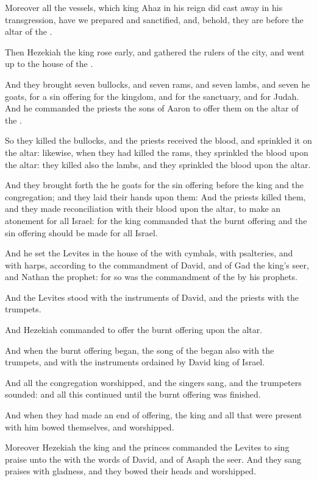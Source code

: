 \verse Moreover all the vessels, which king Ahaz in his reign did cast away in his transgression, have we prepared and sanctified, and, behold, they are before the altar of the \LORD.

\verse Then Hezekiah the king rose early, and gathered the rulers of the city, and went up to the house of the \LORD.

\verse And they brought seven bullocks, and seven rams, and seven lambs, and seven he goats, for a sin offering for the kingdom, and for the sanctuary, and for Judah. And he commanded the priests the sons of Aaron to offer them on the altar of the \LORD.

\verse So they killed the bullocks, and the priests received the blood, and sprinkled it on the altar: likewise, when they had killed the rams, they sprinkled the blood upon the altar: they killed also the lambs, and they sprinkled the blood upon the altar.

\verse And they brought forth the he goats for the sin offering before the king and the congregation; and they laid their hands upon them: \verse And the priests killed them, and they made reconciliation with their blood upon the altar, to make an atonement for all Israel: for the king commanded that the burnt offering and the sin offering should be made for all Israel.

\verse And he set the Levites in the house of the \LORD with cymbals, with psalteries, and with harps, according to the commandment of David, and of Gad the king's seer, and Nathan the prophet: for so was the commandment of the \LORD by his prophets.

\verse And the Levites stood with the instruments of David, and the priests with the trumpets.

\verse And Hezekiah commanded to offer the burnt offering upon the altar.

And when the burnt offering began, the song of the \LORD began also with the trumpets, and with the instruments ordained by David king of Israel.

\verse And all the congregation worshipped, and the singers sang, and the trumpeters sounded: and all this continued until the burnt offering was finished.

\verse And when they had made an end of offering, the king and all that were present with him bowed themselves, and worshipped.

\verse Moreover Hezekiah the king and the princes commanded the Levites to sing praise unto the \LORD with the words of David, and of Asaph the seer. And they sang praises with gladness, and they bowed their heads and worshipped.


